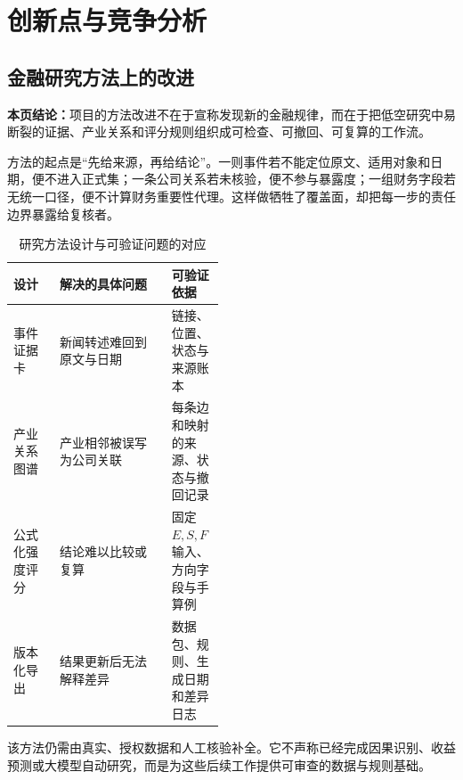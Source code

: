 \clearpage
\section{创新点与竞争分析}
\subsection*{金融研究方法上的改进}\label{page:33}
\fi

\textbf{本页结论：}项目的方法改进不在于宣称发现新的金融规律，而在于把低空研究中易断裂的证据、产业关系和评分规则组织成可检查、可撤回、可复算的工作流。

方法的起点是“先给来源，再给结论”。一则事件若不能定位原文、适用对象和日期，便不进入正式集；一条公司关系若未核验，便不参与暴露度；一组财务字段若无统一口径，便不计算财务重要性代理。这样做牺牲了覆盖面，却把每一步的责任边界暴露给复核者。

\begin{table}[htbp]
\centering
\caption{研究方法设计与可验证问题的对应}
\label{tab:wty-method-improvement}
\small
\begin{tabularx}{\linewidth}{p{0.22\linewidth}X p{0.25\linewidth}}
\toprule
设计 & 解决的具体问题 & 可验证依据 \\
\midrule
事件证据卡 & 新闻转述难回到原文与日期 & 链接、位置、状态与来源账本 \\
产业关系图谱 & 产业相邻被误写为公司关联 & 每条边和映射的来源、状态与撤回记录 \\
公式化强度评分 & 结论难以比较或复算 & 固定 $E,S,F$ 输入、方向字段与手算例 \\
版本化导出 & 结果更新后无法解释差异 & 数据包、规则、生成日期和差异日志 \\
\bottomrule
\end{tabularx}
\end{table}

该方法仍需由真实、授权数据和人工核验补全。它不声称已经完成因果识别、收益预测或大模型自动研究，而是为这些后续工作提供可审查的数据与规则基础。
